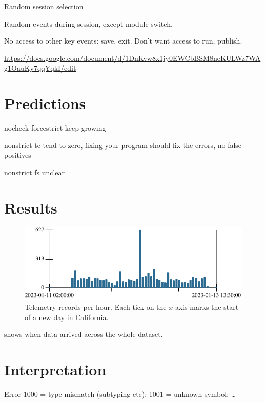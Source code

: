 \documentclass[acmsmall,review,anonymous]{acmart}
\begin{document}
Random session selection

Random events during session, except module switch.

No access to other key events: save, exit.
Don't want access to run, publish.

\url{https://docs.google.com/document/d/1DnKvw8x1jy0EWCbBSM8neKULWz7WAg1OauKy7qqYqkI/edit}


\section{Predictions}

nocheck forcestrict keep growing

nonstrict te tend to zero, fixing your program should fix the errors, no false positives

nonstrict fs unclear


\section{Results}
\label{s:data}

\begin{figure}[t]
  \includegraphics{img/row-distribution.pdf}
  \caption{Telemetry records per hour. Each tick on the $x$-axis marks the start of a new day in California.}
  \label{f:records-per-hour}
\end{figure}

 shows when data arrived across the whole dataset.


\section{Interpretation}

Error 1000 = type mismatch (subtyping etc);
1001 = unknown symbol;
\ldots

\end{document}
